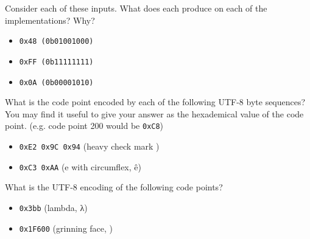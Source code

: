 \documentclass[12pt, oneside, landscape]{article}
\begin{document}
\begin{minipage}{0.45\textwidth}
    
    
\end{minipage}
\hfill
\begin{minipage}{0.45\textwidth}
    Consider each of these inputs. What does each produce on each of the implementations? Why?
    \begin{itemize}
        \item {\tt 0x48 (0b01001000)}
        \item {\tt 0xFF (0b11111111)}
        \item {\tt 0x0A (0b00001010)}
    \end{itemize}
\end{minipage}

\vspace{3em}

What is the code point encoded by each of the following UTF-8 byte sequences?
You may find it useful to give your answer as the hexademical value of the code
point. (e.g. code point 200 would be {\tt 0xC8})

\begin{itemize}
    \item {\tt 0xE2 0x9C 0x94} (heavy check mark )

    \vspace{3em}
    \item {\tt 0xC3 0xAA} (e with circumflex, {\HiraginoSans ê})
\end{itemize}

\vspace{3em}

What is the UTF-8 encoding of the following code points?

\begin{itemize}
    \item {\tt 0x3bb} (lambda, {\HiraginoSans λ})
    \vspace{3em}
    \item {\tt 0x1F600} (grinning face, )
\end{itemize}
\newpage


\end{document}
